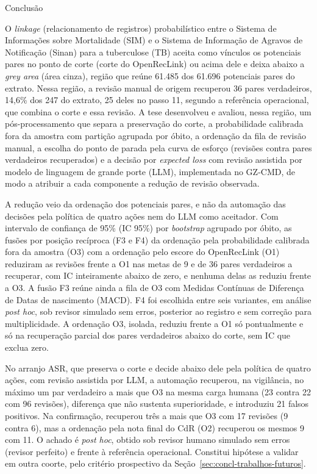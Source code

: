 \begin{chapter}{Conclusão}\label{cap:conclusao}

O \textit{linkage} (relacionamento de registros) probabilístico entre o Sistema de Informações sobre Mortalidade (SIM) e o Sistema de Informação de Agravos de Notificação (Sinan) para a tuberculose (TB) aceita como vínculos os potenciais pares no ponto de corte (corte do OpenRecLink) ou acima dele e deixa abaixo a \textit{grey area} (área cinza), região que reúne 61.485 dos 61.696 potenciais pares do extrato. Nessa região, a revisão manual de origem recuperou 36 pares verdadeiros, 14,6\% dos 247 do extrato, 25 deles no passo 11, segundo a referência operacional, que combina o corte e essa revisão. A tese desenvolveu e avaliou, nessa região, um pós-processamento que separa a preservação do corte, a probabilidade calibrada fora da amostra com partição agrupada por óbito, a ordenação da fila de revisão manual, a escolha do ponto de parada pela curva de esforço (revisões contra pares verdadeiros recuperados) e a decisão por \textit{expected loss} com revisão assistida por modelo de linguagem de grande porte (LLM), implementada no GZ-CMD, de modo a atribuir a cada componente a redução de revisão observada.

A redução veio da ordenação dos potenciais pares, e não da automação das decisões pela política de quatro ações nem do LLM como aceitador. Com intervalo de confiança de 95\% (IC 95\%) por \textit{bootstrap} agrupado por óbito, as fusões por posição recíproca (F3 e F4) da ordenação pela probabilidade calibrada fora da amostra (O3) com a ordenação pelo escore do OpenRecLink (O1) reduziram as revisões frente a O1 nas metas de 9 e de 36 pares verdadeiros a recuperar, com IC inteiramente abaixo de zero, e nenhuma delas as reduziu frente a O3. A fusão F3 reúne ainda a fila de O3 com Medidas Contínuas de Diferença de Datas de nascimento (MACD). F4 foi escolhida entre seis variantes, em análise \textit{post hoc}, sob revisor simulado sem erros, posterior ao registro e sem correção para multiplicidade. A ordenação O3, isolada, reduziu frente a O1 só pontualmente e só na recuperação parcial dos pares verdadeiros abaixo do corte, sem IC que exclua zero.

No arranjo ASR, que preserva o corte e decide abaixo dele pela política de quatro ações, com revisão assistida por LLM, a automação recuperou, na vigilância, no máximo um par verdadeiro a mais que O3 na mesma carga humana (23 contra 22 com 96 revisões), diferença que não sustenta superioridade, e introduziu 21 falsos positivos. Na confirmação, recuperou três a mais que O3 com 17 revisões (9 contra 6), mas a ordenação pela nota final do CdR (O2) recuperou os mesmos 9 com 11. O achado é \textit{post hoc}, obtido sob revisor humano simulado sem erros (revisor perfeito) e frente à referência operacional. Constitui hipótese a validar em outra coorte, pelo critério prospectivo da Seção~\ref{sec:concl-trabalhos-futuros}.


\end{chapter}
